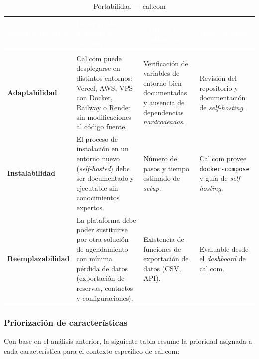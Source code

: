 \documentclass[12pt, a4paper]{article}
\newcommand{\rowpair}{\rowcolor{grisMedio}}
\newcommand{\rowimpar}{\rowcolor{grisClaro}}
\begin{document}
\begin{longtable}{>{\bfseries}p{3cm} p{4.5cm} p{4cm} p{3.5cm}}
\caption{Portabilidad — cal.com} \label{tab:portabilidad} \\
\rowcolor{azulClaro}
\textcolor{white}{\textbf{Subcaracterística}} &
\textcolor{white}{\textbf{Descripción aplicada a cal.com}} &
\textcolor{white}{\textbf{Criterio de evaluación}} &
\textcolor{white}{\textbf{Observaciones}} \\
\endfirsthead
\multicolumn{4}{c}{\tablename\ \thetable{} -- continuación} \\
\endhead
\rowpair
Adaptabilidad &
Cal.com puede desplegarse en distintos entornos: Vercel, AWS, VPS con Docker, Railway o
Render sin modificaciones al código fuente. &
Verificación de variables de entorno bien documentadas y ausencia de dependencias
\textit{hardcodeadas}. &
Revisión del repositorio y documentación de \textit{self-hosting}. \\
\rowimpar
Instalabilidad &
El proceso de instalación en un entorno nuevo (\textit{self-hosted}) debe ser
documentado y ejecutable sin conocimientos expertos. &
Número de pasos y tiempo estimado de \textit{setup}. &
Cal.com provee \texttt{docker-compose} y guía de \textit{self-hosting}. \\
\rowpair
Reemplazabilidad &
La plataforma debe poder sustituirse por otra solución de agendamiento con mínima
pérdida de datos (exportación de reservas, contactos y configuraciones). &
Existencia de funciones de exportación de datos (CSV, API). &
Evaluable desde el \textit{dashboard} de cal.com. \\
\end{longtable}

\subsubsection*{Priorización de características}

Con base en el análisis anterior, la siguiente tabla resume la prioridad asignada a cada
característica para el contexto específico de cal.com:
\end{document}
